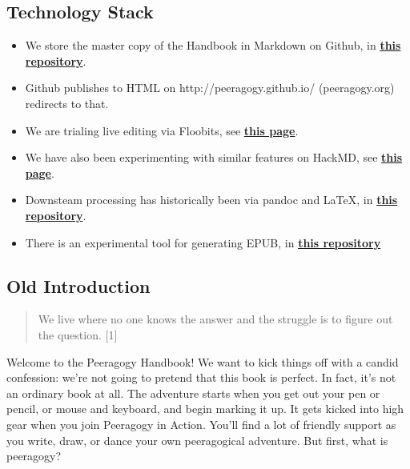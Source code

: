 \hypertarget{technology-stack}{%
\subsection{Technology Stack}\label{technology-stack}}

\begin{itemize}
\tightlist
\item
  We store the master copy of the Handbook in Markdown on Github, in
  \href{https://github.com/Peeragogy/Peeragogy.github.io}{\textbf{this
  repository}}.
\item
  Github publishes to HTML on http://peeragogy.github.io/
  (peeragogy.org) redirects to that.
\item
  We are trialing live editing via Floobits, see
  \href{https://floobits.com/Peeragogy/Handbook/file/action.md:1?new_workspace=1}{\textbf{this
  page}}.
\item
  We have also been experimenting with similar features on HackMD, see
  \href{https://hackmd.io/zEY9rv5QR3O9JFl4jVCYFw}{\textbf{this page}}.
\item
  Downsteam processing has historically been via pandoc and LaTeX, in
  \href{https://github.com/Peeragogy/peeragogy-handbook}{\textbf{this
  repository}}.
\item
  There is an experimental tool for generating EPUB, in
  \href{https://gitlab.com/skreutzer/peeragogy-handbook-experimental}{\textbf{this
  repository}}
\end{itemize}

\hypertarget{old-introduction}{%
\subsection{Old Introduction}\label{old-introduction}}

\begin{quote}
We live where no one knows the answer and the struggle is to figure out
the question. {[}1{]}
\end{quote}

Welcome to the Peeragogy Handbook! We want to kick things off with a
candid confession: we're not going to pretend that this book is perfect.
In fact, it's not an ordinary book at all. The adventure starts when you
get out your pen or pencil, or mouse and keyboard, and begin marking it
up. It gets kicked into high gear when you join Peeragogy in Action.
You'll find a lot of friendly support as you write, draw, or dance your
own peeragogical adventure. But first, what is peeragogy?

